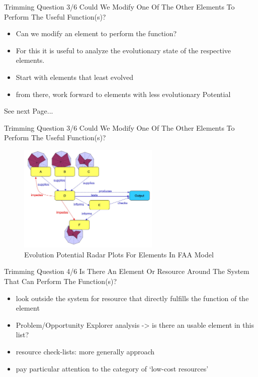 \documentclass{beamer}
\begin{document}
	
	\begin{frame}{Trimming Question 3/6}
		Could We Modify One Of The Other Elements To Perform The Useful Function(s)?
		\begin{itemize}
			\item Can we modify an element to perform the function?
			\item For this it is useful to analyze the evolutionary state of the respective elements.
			\item Start with elements that least evolved
			\item from there, work forward to elements with less evolutionary Potential
		\end{itemize}
		
		See next Page...
	\end{frame}
	
	\begin{frame}{Trimming Question 3/6}
	Could We Modify One Of The Other Elements To Perform The Useful Function(s)?
		\begin{figure}
			\centering
			\includegraphics[width=0.6\textwidth]{img/q3.jpg}
			\caption{Evolution Potential Radar Plots For Elements In FAA Model}
		\end{figure}
	\end{frame}
	
	\begin{frame}{Trimming Question 4/6}
		Is There An Element Or Resource Around The System That Can Perform The Function(s)?
		\begin{itemize}
			\item look outside the system for resource that directly fulfills the function of the element
			\item Problem/Opportunity Explorer analysis -> is there an usable element in this list? 
			\item resource check-lists: more generally approach
			\item pay particular attention to the category of ‘low-cost resources’
		\end{itemize}
	\end{frame}
	
\end{document}
